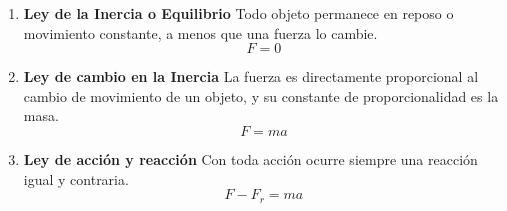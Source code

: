 \begin{tcolorbox}[
        colback=colorrds!5!white,
        colframe=colorrds!35!white,
        coltitle=black,
        fonttitle=\bfseries,
        center title,
        title=Las leyes de Newton
    ]
    \begin{enumerate}
        \item \textbf{Ley de la Inercia o Equilibrio} Todo objeto permanece en reposo o movimiento constante, a menos que una fuerza lo cambie. \[F=0\]
        \item \textbf{Ley de cambio en la Inercia} La fuerza es directamente proporcional al cambio de movimiento de un objeto, y su constante de proporcionalidad es la masa.\[F=ma\]
        \item \textbf{Ley de acción y reacción} Con toda acción ocurre siempre una reacción igual y contraria. \[F-F_r=ma\]
    \end{enumerate}
\end{tcolorbox}
